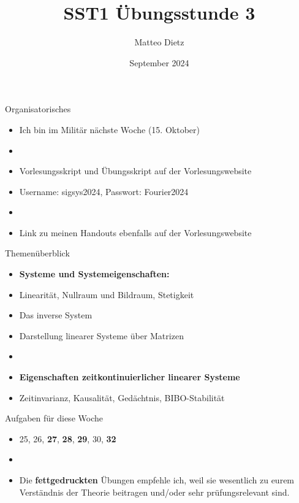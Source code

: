 \documentclass[14pt, aspectratio=169, handout]{beamer}
\title{SST1 Übungsstunde 3}
\author{Matteo Dietz}
\date{September 2024}
\begin{document}
\maketitle

\begin{frame}{Organisatorisches}
    \begin{itemize}
        \item \alert{Ich bin im Militär nächste Woche (15. Oktober)}
        \item[]
        \item Vorlesungsskript und Übungsskript auf der Vorlesungswebsite
        \item[] Username: sigsys2024, \hspace{10pt} Passwort: Fourier2024
        \item[] 
        \item Link zu meinen Handouts ebenfalls auf der Vorlesungswebsite
    \end{itemize}
\end{frame}

\begin{frame}{Themenüberblick}
    \begin{itemize}
        \item \textbf{Systeme und Systemeigenschaften:}
        \item[] Linearität, Nullraum und Bildraum, Stetigkeit
        \item[] Das inverse System
        \item[] Darstellung linearer Systeme über Matrizen
        \item[] 
        \item \textbf{Eigenschaften zeitkontinuierlicher linearer Systeme}
        \item[] Zeitinvarianz, Kausalität, Gedächtnis, BIBO-Stabilität
    \end{itemize}
\end{frame}

\begin{frame}{Aufgaben für diese Woche}
    \begin{itemize}
        \item[] 25, 26, \textbf{27}, \textbf{28}, \textbf{29}, 30, \textbf{32}
        \item[] 
        \item[] Die \textbf{fettgedruckten} Übungen empfehle ich, weil sie wesentlich zu eurem Verständnis der Theorie beitragen und/oder sehr prüfungsrelevant sind.
    \end{itemize}
\end{frame}
\end{document}
